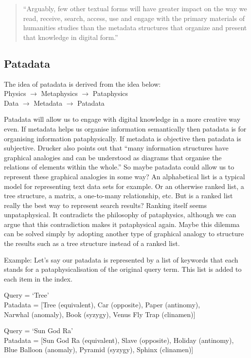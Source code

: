 \begin{quote}
  ``Arguably, few other textual forms will have greater impact on the way we read, receive, search, access, use and engage with the primary materials of humanities studies than the metadata structures that organize and present that knowledge in digital form.'' \autocite[p.9]{Drucker2009}
\end{quote}


\subsection{Patadata}

The idea of patadata is derived from the idea below:\\
Physics $\to$ Metaphysics $\to$ Pataphysics\\
Data $\to$ Metadata $\to$ Patadata

Patadata will allow us to engage with digital knowledge in a more creative way even. If metadata helps us organise information semantically then patadata is for organising information pataphysically. If metadata is objective then patadata is subjective. Drucker also points out that ``many information structures have graphical analogies and can be understood as diagrams that organise the relations of elements within the whole.'' \autocite[p.16]{Drucker2009} So maybe patadata could allow us to represent these graphical analogies in some way? An alphabetical list is a typical model for representing text data sets for example. Or an otherwise ranked list, a tree structure, a matrix, a one-to-many relationship, etc. But is a ranked list really the best way to represent search results? Ranking itself seems unpataphysical. It contradicts the philosophy of pataphysics, although we can argue that this contradiction makes it pataphysical again. Maybe this dilemma can be solved simply by adopting another type of graphical analogy to structure the results such as a tree structure instead of a ranked list.

Example: Let's say our patadata is represented by a list of keywords that each stands for a pataphysicalisation of the original query term. This list is added to each item in the index.

Query      = `Tree'\\
Patadata = [Tree (equivalent),  Car (opposite), Paper (antinomy),\\ Narwhal (anomaly), Book (syzygy), Venus Fly Trap (clinamen)]

Query      = `Sun God Ra'\\
Patadata = [Sun God Ra (equivalent), Slave (opposite), Holiday (antinomy),\\ Blue Balloon (anomaly), Pyramid (syzygy), Sphinx (clinamen)]


